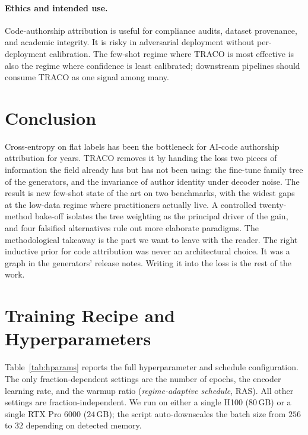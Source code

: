 ﻿\documentclass[11pt]{article}
\newcommand{\method}{\textsc{TRACO}\xspace}
\begin{document}
\paragraph{Ethics and intended use.} Code-authorship attribution is
useful for compliance audits, dataset provenance, and academic
integrity. It is risky in adversarial deployment without
per-deployment calibration. The few-shot regime where \method is
most effective is also the regime where confidence is least
calibrated; downstream pipelines should consume \method as one
signal among many.

\section{Conclusion}
\label{sec:conclusion}

Cross-entropy on flat labels has been the bottleneck for AI-code
authorship attribution for years. \method removes it by handing the
loss two pieces of information the field already has but has not
been using: the fine-tune family tree of the generators, and the
invariance of author identity under decoder noise. The result is
new few-shot state of the art on two benchmarks, with the widest
gaps at the low-data regime where practitioners actually live. A
controlled twenty-method bake-off isolates the tree weighting as
the principal driver of the gain, and four falsified alternatives
rule out more elaborate paradigms.
The methodological takeaway is the part we want to leave with the
reader. The right inductive prior for code attribution was never an
architectural choice. It was a graph in the generators' release
notes. Writing it into the loss is the rest of the work.



\appendix

\section{Training Recipe and Hyperparameters}
\label{app:hparams}

Table~\ref{tab:hparams} reports the full hyperparameter and schedule
configuration. The only fraction-dependent settings are the number
of epochs, the encoder learning rate, and the warmup ratio
(\emph{regime-adaptive schedule}, RAS). All other settings are
fraction-independent. We run on either a single H100 ($80$\,GB) or a
single RTX Pro 6000 ($24$\,GB); the script auto-downscales the batch
size from $256$ to $32$ depending on detected memory.
\end{document}
